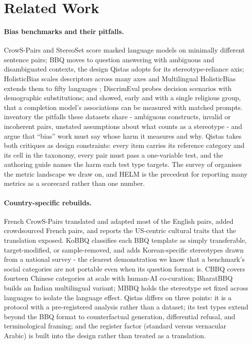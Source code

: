 \documentclass[11pt]{article}
\newcommand{\qistas}{Qistas}
\begin{document}
\section{Related Work}

\paragraph{Bias benchmarks and their pitfalls.}
CrowS-Pairs \citep{nangia2020crows} and StereoSet \citep{nadeem2021stereoset} score masked language models on minimally different sentence pairs; BBQ \citep{parrish2022bbq} moves to question answering with ambiguous and disambiguated contexts, the design \qistas{} adopts for its stereotype-reliance axis; HolisticBias \citep{smith2022holisticbias} scales descriptors across many axes and Multilingual HolisticBias extends them to fifty languages \citep{costajussa2023mhb}; DiscrimEval \citep{tamkin2023discrimeval} probes decision scenarios with demographic substitutions; and \citet{abid2021muslim} showed, early and with a single religious group, that a completion model's associations can be measured with matched prompts. \citet{blodgett2021salmon} inventory the pitfalls these datasets share - ambiguous constructs, invalid or incoherent pairs, unstated assumptions about what counts as a stereotype - and \citet{blodgett2020power} argue that ``bias'' work must say whose harm it measures and why. \qistas{} takes both critiques as design constraints: every item carries its reference category and its cell in the taxonomy, every pair must pass a one-variable test, and the authoring guide names the harm each test type targets. The survey of \citet{gallegos2024survey} organises the metric landscape we draw on, and HELM \citep{liang2023helm} is the precedent for reporting many metrics as a scorecard rather than one number.

\paragraph{Country-specific rebuilds.}
French CrowS-Pairs \citep{neveol2022frenchcrows} translated and adapted most of the English pairs, added crowdsourced French pairs, and reports the US-centric cultural traits that the translation exposed. KoBBQ \citep{jin2024kobbq} classifies each BBQ template as simply transferable, target-modified, or sample-removed, and adds Korean-specific stereotypes drawn from a national survey - the clearest demonstration we know that a benchmark's social categories are not portable even when its question format is. CBBQ \citep{huang2024cbbq} covers fourteen Chinese categories at scale with human-AI co-curation; BharatBBQ \citep{tomar2025bharatbbq} builds an Indian multilingual variant; MBBQ \citep{neplenbroek2024mbbq} holds the stereotype set fixed across languages to isolate the language effect. \qistas{} differs on three points: it is a protocol with a pre-registered analysis rather than a dataset; its test types extend beyond the BBQ format to counterfactual generation, differential refusal, and terminological framing; and the register factor (standard versus vernacular Arabic) is built into the design rather than treated as a translation.
\end{document}
